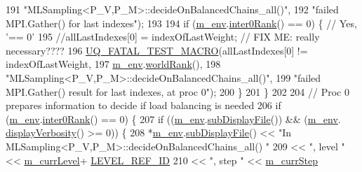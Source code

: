 \begin{DoxyCode}
191                                 \textcolor{stringliteral}{"MLSampling<P\_V,P\_M>::decideOnBalancedChains\_all()"},
192                                 \textcolor{stringliteral}{"failed MPI.Gather() for last indexes"});
193 
194       \textcolor{keywordflow}{if} (\hyperlink{class_q_u_e_s_o_1_1_m_l_sampling_a13f1ca4fe9f94822fe572a743eaced1d}{m\_env}.\hyperlink{class_q_u_e_s_o_1_1_base_environment_ae106b5bb8a80b655b88b3a26b1e7c185}{inter0Rank}() == 0) \{ \textcolor{comment}{// Yes, '== 0'}
195         \textcolor{comment}{//allLastIndexes[0] = indexOfLastWeight; // FIX ME: really necessary????}
196         \hyperlink{_defines_8h_a56d63d18d0a6d45757de47fcc06f574d}{UQ\_FATAL\_TEST\_MACRO}(allLastIndexes[0] != indexOfLastWeight,
197                             \hyperlink{class_q_u_e_s_o_1_1_m_l_sampling_a13f1ca4fe9f94822fe572a743eaced1d}{m\_env}.\hyperlink{class_q_u_e_s_o_1_1_base_environment_a78b57112bbd0e6dd0e8afec00b40ffa7}{worldRank}(),
198                             \textcolor{stringliteral}{"MLSampling<P\_V,P\_M>::decideOnBalancedChains\_all()"},
199                             \textcolor{stringliteral}{"failed MPI.Gather() result for last indexes, at proc 0"});
200       \}
201     \}
202 
204     \textcolor{comment}{// Proc 0 prepares information to decide if load balancing is needed}
206 \textcolor{comment}{}    \textcolor{keywordflow}{if} (\hyperlink{class_q_u_e_s_o_1_1_m_l_sampling_a13f1ca4fe9f94822fe572a743eaced1d}{m\_env}.\hyperlink{class_q_u_e_s_o_1_1_base_environment_ae106b5bb8a80b655b88b3a26b1e7c185}{inter0Rank}() == 0) \{
207       \textcolor{keywordflow}{if} ((\hyperlink{class_q_u_e_s_o_1_1_m_l_sampling_a13f1ca4fe9f94822fe572a743eaced1d}{m\_env}.\hyperlink{class_q_u_e_s_o_1_1_base_environment_a8a0064746ae8dddfece4229b9ad374d6}{subDisplayFile}()) && (\hyperlink{class_q_u_e_s_o_1_1_m_l_sampling_a13f1ca4fe9f94822fe572a743eaced1d}{m\_env}.
      \hyperlink{class_q_u_e_s_o_1_1_base_environment_a1fe5f244fc0316a0ab3e37463f108b96}{displayVerbosity}() >= 0)) \{
208         *\hyperlink{class_q_u_e_s_o_1_1_m_l_sampling_a13f1ca4fe9f94822fe572a743eaced1d}{m\_env}.\hyperlink{class_q_u_e_s_o_1_1_base_environment_a8a0064746ae8dddfece4229b9ad374d6}{subDisplayFile}() << \textcolor{stringliteral}{"In MLSampling<P\_V,P\_M>::decideOnBalancedChains\_all()
      "}
209                                 << \textcolor{stringliteral}{", level "} << \hyperlink{class_q_u_e_s_o_1_1_m_l_sampling_af9416874c856e50f3b35270e801f17e4}{m\_currLevel}+
      \hyperlink{_m_l_sampling_level_options_8h_a68d15eaf394d210effcf584b938206d3}{LEVEL\_REF\_ID}
210                                 << \textcolor{stringliteral}{", step "}  << \hyperlink{class_q_u_e_s_o_1_1_m_l_sampling_a1b1f8ccb4823bdfa26ec652f0807c63e}{m\_currStep}

\end{DoxyCode}
